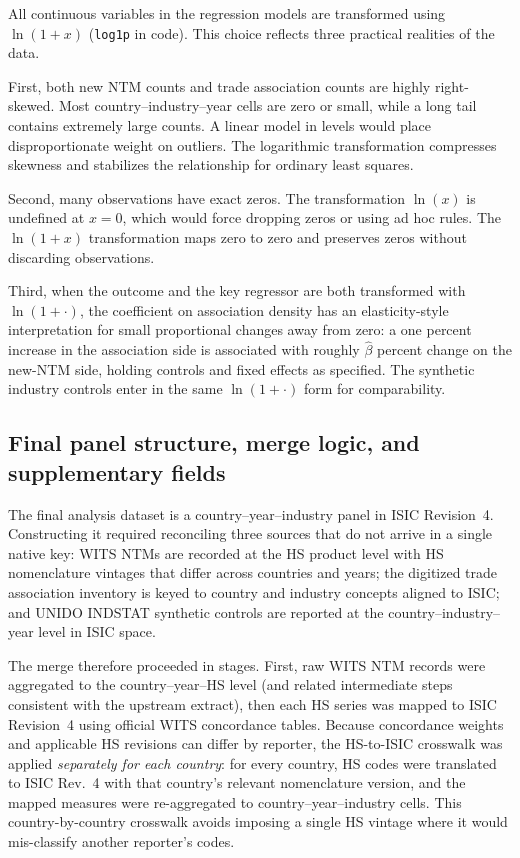 \documentclass[12pt,letterpaper]{article}
\begin{document}
All continuous variables in the regression models are transformed using $\ln(1+x)$ (\texttt{log1p} in code). This choice reflects three practical realities of the data.

First, both new NTM counts and trade association counts are highly right-skewed. Most country--industry--year cells are zero or small, while a long tail contains extremely large counts. A linear model in levels would place disproportionate weight on outliers. The logarithmic transformation compresses skewness and stabilizes the relationship for ordinary least squares.

Second, many observations have exact zeros. The transformation $\ln(x)$ is undefined at $x=0$, which would force dropping zeros or using ad hoc rules. The $\ln(1+x)$ transformation maps zero to zero and preserves zeros without discarding observations.

Third, when the outcome and the key regressor are both transformed with $\ln(1+\cdot)$, the coefficient on association density has an elasticity-style interpretation for small proportional changes away from zero: a one percent increase in the association side is associated with roughly $\hat\beta$ percent change on the new-NTM side, holding controls and fixed effects as specified. The synthetic industry controls enter in the same $\ln(1+\cdot)$ form for comparability.

\subsection{Final panel structure, merge logic, and supplementary fields}

The final analysis dataset is a country--year--industry panel in ISIC Revision~4. Constructing it required reconciling three sources that do not arrive in a single native key: WITS NTMs are recorded at the HS product level with HS nomenclature vintages that differ across countries and years; the digitized trade association inventory is keyed to country and industry concepts aligned to ISIC; and UNIDO INDSTAT synthetic controls are reported at the country--industry--year level in ISIC space.

The merge therefore proceeded in stages. First, raw WITS NTM records were aggregated to the country--year--HS level (and related intermediate steps consistent with the upstream extract), then each HS series was mapped to ISIC Revision~4 using official WITS concordance tables. Because concordance weights and applicable HS revisions can differ by reporter, the HS-to-ISIC crosswalk was applied \emph{separately for each country}: for every country, HS codes were translated to ISIC Rev.~4 with that country's relevant nomenclature version, and the mapped measures were re-aggregated to country--year--industry cells. This country-by-country crosswalk avoids imposing a single HS vintage where it would mis-classify another reporter's codes.
\end{document}
